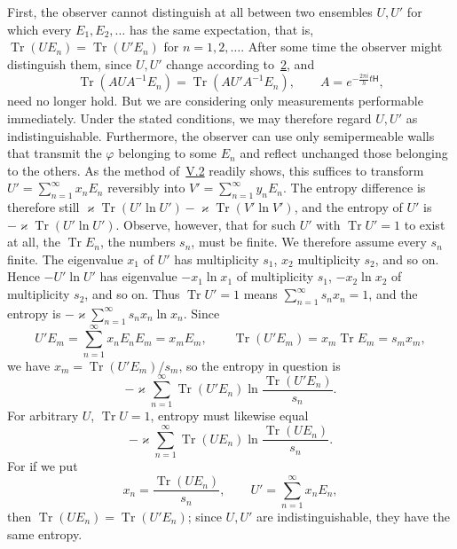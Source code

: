 \documentclass[fontsize=13pt,twoside,openany,headings=normal,parskip=false,bookmarkpackage=false,DIV=calc]{scrbook}
\begin{document}
First, the observer cannot distinguish at all between two ensembles $U,U'$ for which every $E_1,E_2,\ldots$ has the same expectation, that is, $\operatorname{Tr}(UE_n)=\operatorname{Tr}(U'E_n)$ for $n=1,2,\ldots$. After some time the observer might distinguish them, since $U,U'$ change according to~\hyperref[eq:V.1.2]{2}, and
\[
\operatorname{Tr}(AUA^{-1}E_n)=\operatorname{Tr}(AU'A^{-1}E_n),\qquad
A=e^{-\frac{2\pi i}{h}t\mathsf{H}},
\]
need no longer hold. But we are considering only measurements performable immediately. Under the stated conditions, we may therefore regard $U,U'$ as indistinguishable. Furthermore, the observer can use only semipermeable walls that transmit the $\varphi$ belonging to some $E_n$ and reflect unchanged those belonging to the others. As the method of~\hyperref[sec:V.2]{V.2} readily shows, this suffices to transform $U'=\sum_{n=1}^{\infty}x_nE_n$ reversibly into $V'=\sum_{n=1}^{\infty}y_nE_n$. The entropy difference is therefore still $\varkappa\operatorname{Tr}(U'\ln U')-\varkappa\operatorname{Tr}(V'\ln V')$, and the entropy of $U'$ is $-\varkappa\operatorname{Tr}(U'\ln U')$. Observe, however, that for such $U'$ with $\operatorname{Tr}U'=1$ to exist at all, the $\operatorname{Tr}E_n$, the numbers $s_n$, must be finite. We therefore assume every $s_n$ finite. The eigenvalue $x_1$ of $U'$ has multiplicity $s_1$, $x_2$ multiplicity $s_2$, and so on. Hence $-U'\ln U'$ has eigenvalue $-x_1\ln x_1$ of multiplicity $s_1$, $-x_2\ln x_2$ of multiplicity $s_2$, and so on. Thus $\operatorname{Tr}U'=1$ means $\sum_{n=1}^{\infty}s_nx_n=1$, and the entropy is $-\varkappa\sum_{n=1}^{\infty}s_nx_n\ln x_n$. Since
\[
U'E_m=\sum_{n=1}^{\infty}x_nE_nE_m=x_mE_m,\qquad
\operatorname{Tr}(U'E_m)=x_m\operatorname{Tr}E_m=s_mx_m,
\]
we have $x_m=\operatorname{Tr}(U'E_m)/s_m$, so the entropy in question is
\[
-\varkappa\sum_{n=1}^{\infty}\operatorname{Tr}(U'E_n)
\ln\frac{\operatorname{Tr}(U'E_n)}{s_n}.
\]
For arbitrary $U$, $\operatorname{Tr}U=1$, entropy must likewise equal
\[
-\varkappa\sum_{n=1}^{\infty}\operatorname{Tr}(UE_n)
\ln\frac{\operatorname{Tr}(UE_n)}{s_n}.
\]
\hypertarget{origpage-220}{}%
For if we put
\[
x_n=\frac{\operatorname{Tr}(UE_n)}{s_n},\qquad U'=\sum_{n=1}^{\infty}x_nE_n,
\]
then $\operatorname{Tr}(UE_n)=\operatorname{Tr}(U'E_n)$; since $U,U'$ are indistinguishable, they have the same entropy.
\end{document}
